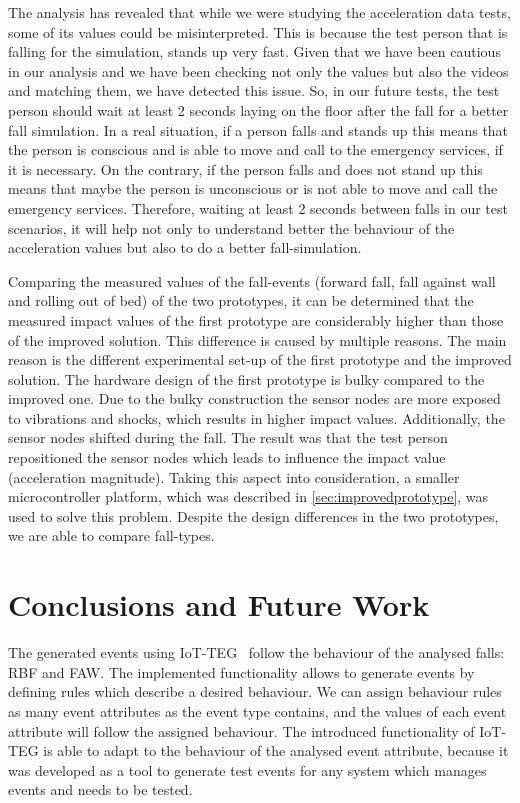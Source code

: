 \documentclass[journal]{IEEEtran}
\begin{document}
The analysis has revealed that while we were studying the acceleration data tests, some of its values could be misinterpreted.
This is because the test person that is falling for the simulation, stands up very fast. Given that we have been cautious
in our analysis and we have been checking not only the values but also the videos and matching them, we have detected
this issue. So, in our future tests, the test person should wait at least 2 seconds laying on the floor 
after the fall for a better fall simulation. In a real situation, if a
person falls and stands up this means that the person
is conscious and is able to move and call to the emergency services, if it is necessary. On the contrary, if the person
falls and does not stand up this means that maybe the person is unconscious or is not able to move and call the emergency
services. Therefore, waiting at least 2 seconds between falls in our test scenarios, it will help not only to understand 
better the behaviour of the acceleration values but also to do a better fall-simulation.

Comparing the measured values of the fall-events (forward fall, fall against wall and rolling out of bed) of the two 
prototypes, it can be determined that the measured impact values of the first prototype are considerably higher than 
those of the improved solution. This difference is caused by multiple reasons. The main reason is the different 
experimental set-up of the first prototype and the improved solution. The hardware design of the first prototype is 
bulky compared to the improved one. Due to the bulky construction the sensor nodes are more exposed to vibrations and 
shocks, which results in higher impact values. Additionally, the sensor nodes shifted during the fall. The result was 
that the test person repositioned the sensor nodes which leads to influence the impact value (acceleration magnitude). 
Taking this aspect into consideration, a smaller microcontroller
platform, which was described in \ref{sec:improvedprototype}, was used
to solve this problem. Despite the design differences in the two
prototypes,  
we are able to compare fall-types.

\section{Conclusions and Future Work}
\label{sec:conclusions}

The generated events using IoT-TEG~\cite{TesisGutierrez2017,Gutierrez2017} follow the behaviour of the analysed falls: 
RBF and FAW. The implemented functionality 
allows to generate events by defining rules which describe a desired behaviour. We can assign behaviour rules as many 
event attributes as the event type contains, and the values of each event attribute will follow the assigned behaviour.
The introduced functionality of IoT-TEG is able to adapt to the behaviour of the analysed event attribute, because
it was developed as a tool to generate test events for any system
which manages events and needs to be tested.
\end{document}

